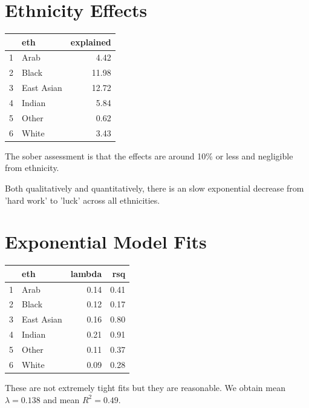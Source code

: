 \documentclass{amsart}
\begin{document}
\section{Ethnicity Effects}
\begin{table}[ht]
\centering
\begin{tabular}{rlr}
  \hline
 & eth & explained \\ 
  \hline
1 & Arab & 4.42 \\ 
  2 & Black & 11.98 \\ 
  3 & East Asian & 12.72 \\ 
  4 & Indian & 5.84 \\ 
  5 & Other & 0.62 \\ 
  6 & White & 3.43 \\ 
   \hline
\end{tabular}
\end{table}

The sober assessment is that the effects are around 10\% or less and negligible from ethnicity.

Both qualitatively and quantitatively, there is an slow exponential decrease from 'hard work' to 'luck' across all ethnicities.

\section{Exponential Model Fits}

\begin{table}[ht]
\centering
\begin{tabular}{rlrr}
  \hline
 & eth & lambda & rsq \\ 
  \hline
1 & Arab & 0.14 & 0.41 \\ 
  2 & Black & 0.12 & 0.17 \\ 
  3 & East Asian & 0.16 & 0.80 \\ 
  4 & Indian & 0.21 & 0.91 \\ 
  5 & Other & 0.11 & 0.37 \\ 
  6 & White & 0.09 & 0.28 \\ 
   \hline
\end{tabular}
\end{table}

These are not extremely tight fits but they are reasonable.  We obtain mean $\lambda=0.138$ and mean $R^2=0.49$.
\end{document}
